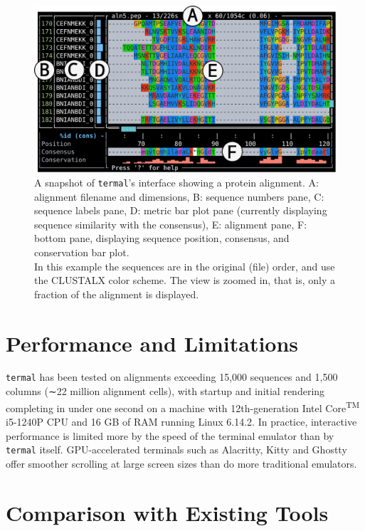 \documentclass[11pt]{article}
\begin{document}
\begin{figure}[htbp]
\centering
	\includegraphics[width=\textwidth]{figure-1.pdf}
\caption{%
	A snapshot of \texttt{termal}'s interface showing a protein alignment. A:
	alignment filename and dimensions, B: sequence numbers pane, C: sequence
	labels pane, D: metric bar plot pane (currently displaying sequence similarity
	with the consensus), E: alignment pane, F: bottom pane, displaying sequence
	position, consensus, and conservation bar plot. \\
	In this example the sequences are in the original (file) order, and use the
	CLUSTALX color scheme. The view is zoomed in, that is, only a fraction of the
	alignment is displayed. }
	\label{fig:screen}
\end{figure}


\section*{Performance and Limitations}

\texttt{termal} has been tested on alignments exceeding 15,000 sequences and
1,500 columns (∼22 million alignment cells), with startup and initial rendering
completing in under one second on a machine with 12th-generation
Intel\textregistered{} Core\textsuperscript{TM} i5-1240P CPU and 16 GB of RAM
running Linux 6.14.2. In practice, interactive performance is limited more by
the speed of the terminal emulator than by \texttt{termal} itself.
GPU-accelerated terminals such as Alacritty\cite{alacritty}, Kitty\cite{kitty}
and Ghostty\cite{ghostty} offer smoother scrolling at large screen sizes than do
more traditional emulators.


\section*{Comparison with Existing Tools}
\end{document}
